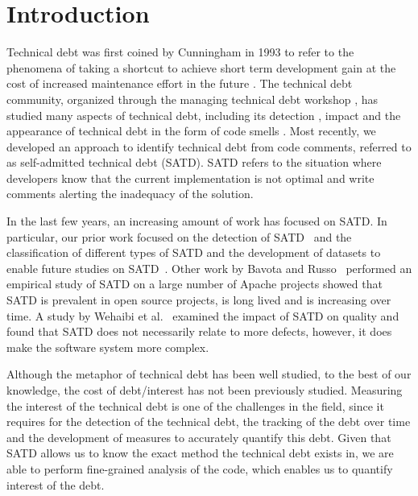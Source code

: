 \section{Introduction}
Technical debt was first coined by Cunningham in 1993 to refer to the phenomena of taking a shortcut to achieve short term development gain at the cost of increased maintenance effort in the future \cite{Cunningham1992WPM}. The technical debt community, organized through the managing technical debt workshop \cite{MTD2016}, has studied many aspects of technical debt, including its detection \cite{Zazworka2013EASE}, impact \cite{Zazworka2011MTD} and the appearance of technical debt in the form of code smells \cite{Fontana2012MTD}. Most recently, we developed an approach to identify technical debt from code comments, referred to as self-admitted technical debt (SATD). SATD refers to the situation where developers know that the current implementation is not optimal and write comments alerting the inadequacy of the solution. 

In the last few years, an increasing amount of work has focused on SATD. In particular, our prior work focused on the detection of SATD~\cite{Potdar2014ICSME} and the classification of different types of SATD and the development of datasets to enable future studies on SATD~\cite{Maldonado2015MTD}. Other work by Bavota and Russo~\cite{Bavota2016MSR} performed an empirical study of SATD on a large number of Apache projects showed that SATD is prevalent in open source projects, is long lived and is increasing over time. A study by Wehaibi et al.~\cite{Wehaibi2016SANER} examined the impact of SATD on quality and found that SATD does not necessarily relate to more defects, however, it does make the software system more complex. 

Although the metaphor of technical debt has been well studied, to the best of our knowledge, the cost of debt/interest has not been previously studied. Measuring the interest of the technical debt is one of the challenges in the field, since it requires for the detection of the technical debt, the tracking of the debt over time and the development of measures to accurately quantify this debt. Given that SATD allows us to know the exact method the technical debt exists in, we are able to perform fine-grained analysis of the code, which enables us to quantify interest of the debt.

